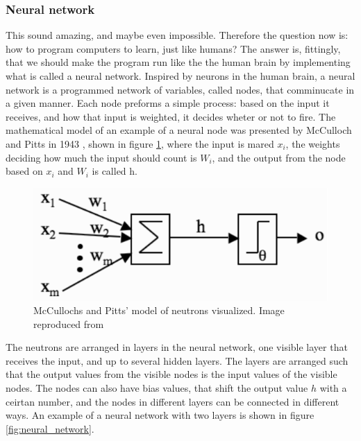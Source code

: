 \documentclass[norsk,a4paper,12pt]{article}
\begin{document}
\subsubsection{Neural network}

 This sound amazing, and maybe even impossible. Therefore the question now is: how to program computers to learn, just like humans? The answer is, fittingly, that we should make the program run like the the human brain by implementing what is called a neural network. Inspired by neurons in the human brain, a neural network is a programmed network of variables, called nodes, that comminucate in a given manner. Each node preforms a simple process: based on the input it receives, and how that input is weighted, it decides wheter or not to fire. The mathematical model of an example of a neural node was presented by McCulloch and Pitts in 1943 \cite{Marsland}, shown in figure \ref{fig:neuron}, where the input is mared $x_i$, the weights deciding how much the input should count is $W_i$, and the output from the node based on $x_i$ and $W_i$ is called h. 

 \begin{figure} [H]
 	\centering
 	\includegraphics[scale=0.6]{plots/neuron.png}
 	\caption{McCullochs and Pitts' model of neutrons visualized. Image reproduced from \cite{Marsland} }
 	\label{fig:neuron}
 \end{figure}

The neutrons are arranged in layers in the neural network, one visible layer that receives the input, and up to several hidden layers. The layers are arranged such that the output values from the visible nodes is the input values of the visible nodes. The nodes can also have bias values, that shift the output value $h$ with a ceirtan number, and the nodes in different layers can be connected in different ways.  An example of a neural network with two layers is shown in figure \ref{fig:neural_network}.
\end{document}
